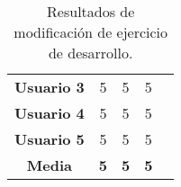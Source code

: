 \begin{table}[H]
{\begin{tabular}{c|ccc|l}
            \multicolumn{1}{|c|}{\textbf{Usuario 3}} & \multicolumn{1}{c|}{5}                                                                                                                                          & \multicolumn{1}{c|}{5}                                                                                                                                                                 & 5                                                                                                                                                                                                        & \\ \cline{1-4}
            \multicolumn{1}{|c|}{\textbf{Usuario 4}} & \multicolumn{1}{c|}{5}                                                                                                                                          & \multicolumn{1}{c|}{5}                                                                                                                                                                 & 5                                                                                                                                                                                                        & \\ \cline{1-4}
            \multicolumn{1}{|c|}{\textbf{Usuario 5}} & \multicolumn{1}{c|}{5}                                                                                                                                          & \multicolumn{1}{c|}{5}                                                                                                                                                                 & 5                                                                                                                                                                                                        & \\ \cline{1-4}
            \multicolumn{1}{|c|}{\textbf{Media}}     & \multicolumn{1}{c|}{\textbf{5}}                                                                                                                                 & \multicolumn{1}{c|}{\textbf{5}}                                                                                                                                                        & \textbf{5}                                                                                                                                                                                               & \\ \cline{1-4}
        \end{tabular}
    }
    \caption{Resultados de modificación de ejercicio de desarrollo.}
    \label{tab:resultadoModificacion}
\end{table}

